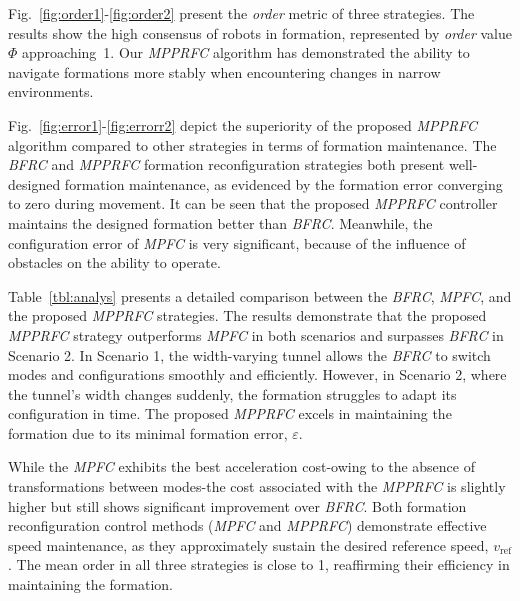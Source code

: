 Fig.~\ref{fig:order1}-\ref{fig:order2} present the \textit{order} metric of three strategies. The results show the high consensus of robots in formation, represented by \textit{order} value $\Phi$ approaching~1. Our \textit{MPPRFC} algorithm has demonstrated the ability to navigate formations more stably when encountering changes in narrow environments.

Fig.~\ref{fig:error1}-\ref{fig:errorr2} depict the superiority of the proposed \textit{MPPRFC} algorithm compared to other strategies in terms of formation maintenance. The \textit{BFRC} and \textit{MPPRFC} formation reconfiguration strategies both present well-designed formation maintenance, as evidenced by the formation error converging to zero during movement. It can be seen that the proposed \textit{MPPRFC} controller maintains the designed formation better than \textit{BFRC}. Meanwhile, the configuration error of \textit{MPFC} is very significant, because of the influence of obstacles on the ability to operate.

Table~\ref{tbl:analys} presents a detailed comparison between the \textit{BFRC}, \textit{MPFC}, and the proposed \textit{MPPRFC} strategies. The results demonstrate that the proposed \textit{MPPRFC} strategy outperforms \textit{MPFC} in both scenarios and surpasses \textit{BFRC} in Scenario 2. In Scenario 1, the width-varying tunnel allows the \textit{BFRC} to switch modes and configurations smoothly and efficiently. However, in Scenario 2, where the tunnel's width changes suddenly, the formation struggles to adapt its configuration in time. The proposed \textit{MPPRFC} excels in maintaining the formation due to its minimal formation error, $\varepsilon$.

While the \textit{MPFC} exhibits the best acceleration cost-owing to the absence of transformations between modes-the cost associated with the \textit{MPPRFC} is slightly higher but still shows significant improvement over \textit{BFRC}. Both formation reconfiguration control methods (\textit{MPFC} and \textit{MPPRFC}) demonstrate effective speed maintenance, as they approximately sustain the desired reference speed, $v_\text{ref}$. The mean order in all three strategies is close to 1, reaffirming their efficiency in maintaining the formation.

